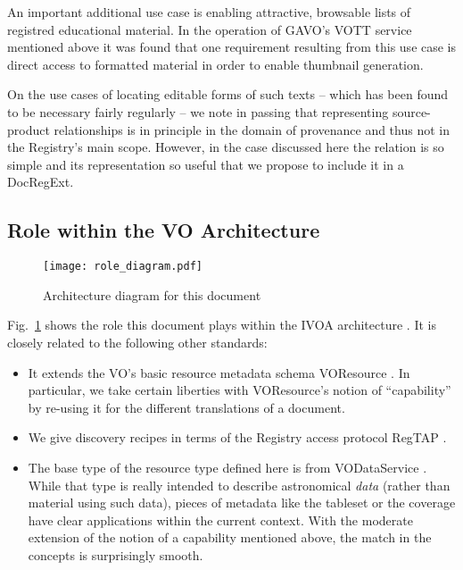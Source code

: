 \documentclass{ivoa}
\begin{document}
An important additional use case is enabling attractive, browsable
lists of registred educational material.  In the operation of GAVO's
VOTT service mentioned above it was found that one
requirement resulting from this use case is direct access to formatted
material in order to enable thumbnail generation.

On the use cases of locating editable forms of such texts – which
has been found to be necessary fairly regularly – we note in passing
that representing source-product relationships is in principle in the
domain of provenance and thus not in the Registry's main scope. However, in
the case discussed here the relation is so simple and its representation
so useful that we propose to include it in a DocRegExt.

\subsection{Role within the VO Architecture}

\begin{figure}
\centering

\texttt{[image: role\_diagram.pdf]}
\caption{Architecture diagram for this document}
\label{fig:archdiag}
\end{figure}

Fig.~\ref{fig:archdiag} shows the role this document plays within the
IVOA architecture \citep{2021ivoa.spec.1101D}.  It is closely related to
the following other standards:

\begin{itemize}
\item It extends the VO's basic resource metadata schema VOResource
\citep{2021ivoa.spec.1102D}.  In particular, we take certain liberties
with VOResource's notion of ``capability'' by re-using it for the
different translations of a document.

\item We give discovery recipes in terms of the Registry access protocol
RegTAP \citep{2019ivoa.spec.1011D}.

\item The base type of the  resource type defined here
is  from VODataService
\citep{2021ivoa.spec.1102D}.  While that type is really intended to
describe astronomical \emph{data} (rather than material using such
data), pieces of metadata like the tableset or the coverage have clear
applications within the current context.  With the moderate extension of
the notion of a capability mentioned above, the match in the concepts is
surprisingly smooth.

\end{itemize}
\end{document}
